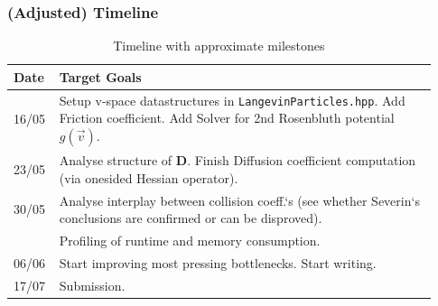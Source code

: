 \begin{frame}
\frametitle{(Adjusted) Timeline}

\begin{table}[]
    \def\arraystretch{1.5}
    \begin{tabular}{p{0.08\linewidth} | p{0.85\linewidth}}
        Date & Target Goals \\
        \hline \hline
        16/05 & Setup v-space datastructures in \texttt{LangevinParticles.hpp}. Add Friction coefficient. Add Solver for 2nd Rosenbluth potential $g(\vec v)$.\\
        23/05 & Analyse structure of $\boldsymbol D$. Finish Diffusion coefficient computation (via onesided Hessian operator). \\
        30/05 & Analyse interplay between collision coeff.`s (see whether Severin`s conclusions are confirmed or can be disproved). \\
              & Profiling of runtime and memory consumption. \\
        06/06 & Start improving most pressing bottlenecks. Start writing. \\
        17/07 & Submission. \\
    \end{tabular}
    \caption{Timeline with approximate milestones}
\end{table}

\end{frame}


